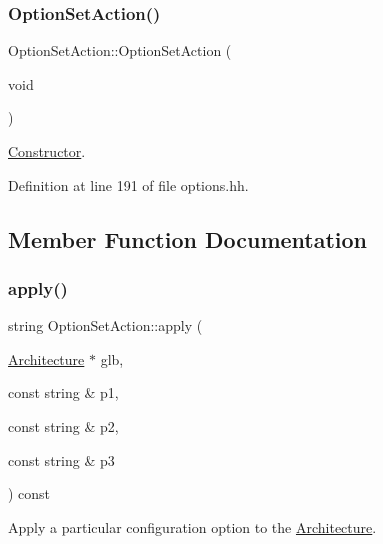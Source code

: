 \subsubsection{\texorpdfstring{OptionSetAction()}{OptionSetAction()}}
{\footnotesize\ttfamily Option\+Set\+Action\+::\+Option\+Set\+Action (\begin{DoxyParamCaption}\item[{void}]{ }\end{DoxyParamCaption})\hspace{0.3cm}{\ttfamily [inline]}}



\mbox{\hyperlink{class_constructor}{Constructor}}. 



Definition at line 191 of file options.\+hh.



\subsection{Member Function Documentation}
\mbox{\label{class_option_set_action_ab24a366561133f89e6584157d53f7b81}} 
\subsubsection{\texorpdfstring{apply()}{apply()}}
{\footnotesize\ttfamily string Option\+Set\+Action\+::apply (\begin{DoxyParamCaption}\item[{\mbox{\hyperlink{class_architecture}{Architecture}} $\ast$}]{glb,  }\item[{const string \&}]{p1,  }\item[{const string \&}]{p2,  }\item[{const string \&}]{p3 }\end{DoxyParamCaption}) const\hspace{0.3cm}{\ttfamily [virtual]}}



Apply a particular configuration option to the \mbox{\hyperlink{class_architecture}{Architecture}}. 

